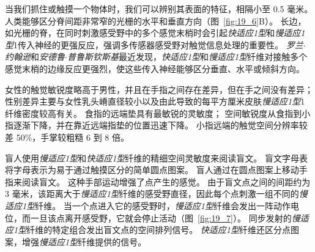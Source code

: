 当我们抓住或触摸一个物体时，我们可以辨别其表面的特征，相隔小至 0.5 毫米。
人类能够区分脊间距非常窄的光栅的水平和垂直方向（图~\ref{fig:19_6}B）。
长边，如光栅的脊，在同时刺激感受野中的多个感觉末梢时会引起\textit{快适应1型}和\textit{慢适应1型}1传入神经的更强反应，强调多传感器感受野对触觉信息处理的重要性。
\textit{罗兰$\cdot$约翰逊}和\textit{安德鲁$\cdot$普鲁斯钦斯基}最近发现，\textit{快适应1型}和\textit{慢适应1型}纤维对接触多个感觉末梢的边缘反应更强烈，使这些传入神经能够区分垂直、水平或倾斜方向。


女性的触觉敏锐度略高于男性，并且在手指之间存在差异，但在手之间没有差异；
性别差异主要与女性乳头嵴直径较小以及由此导致的每平方厘米皮肤\textit{慢适应1型}1纤维密度较高有关。
食指的远端垫具有最敏锐的灵敏度；
空间敏锐度从食指到小指逐渐下降，并在靠近远端指垫的位置迅速下降。
小指远端的触觉空间分辨率较差 50\%，手掌较粗糙 6 到 8 倍。


盲人使用\textit{慢适应1型}和\textit{快适应1型}纤维的精细空间灵敏度来阅读盲文。
盲文字母表将字母表示为易于通过触摸区分的简单圆点图案。
盲人通过在圆点图案上移动手指来阅读盲文。
这种手部运动增强了点产生的感觉。
由于盲文点之间的间距约为 3 毫米，该距离大于\textit{慢适应1型}纤维的感受野直径，因此每个点刺激一组不同的\textit{慢适应1型}纤维。
当一个点进入它的感受野时，\textit{慢适应1型}纤维会发出一阵动作电位，而一旦该点离开感受野，它就会停止活动（图~\ref{fig:19_7}）。
同步发射的\textit{慢适应1型}纤维的特定组合发出盲文点的空间排列信号。
\textit{快适应1型}纤维还区分点图案，增强\textit{慢适应1型}纤维提供的信号。


